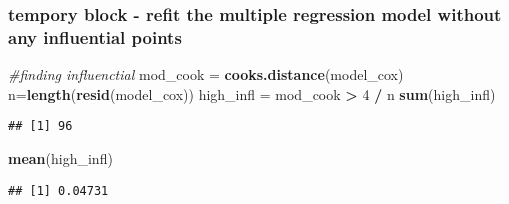 \documentclass[]{article}
\newenvironment{Shaded}{\begin{snugshade}}{\end{snugshade}}
\newcommand{\CommentTok}[1]{\textcolor[rgb]{0.56,0.35,0.01}{\textit{#1}}}
\newcommand{\DecValTok}[1]{\textcolor[rgb]{0.00,0.00,0.81}{#1}}
\newcommand{\KeywordTok}[1]{\textcolor[rgb]{0.13,0.29,0.53}{\textbf{#1}}}
\newcommand{\NormalTok}[1]{#1}
\newcommand{\OperatorTok}[1]{\textcolor[rgb]{0.81,0.36,0.00}{\textbf{#1}}}
\newcommand{\StringTok}[1]{\textcolor[rgb]{0.31,0.60,0.02}{#1}}
\begin{document}
\hypertarget{tempory-block---refit-the-multiple-regression-model-without-any-influential-points}{%
\subsubsection{tempory block - refit the multiple regression model
without any influential
points}\label{tempory-block---refit-the-multiple-regression-model-without-any-influential-points}}

\begin{Shaded}
\begin{Highlighting}[]
\CommentTok{#finding influenctial}
\NormalTok{mod_cook =}\StringTok{ }\KeywordTok{cooks.distance}\NormalTok{(model_cox)}
\NormalTok{n=}\KeywordTok{length}\NormalTok{(}\KeywordTok{resid}\NormalTok{(model_cox))}
\NormalTok{high_infl =}\StringTok{ }\NormalTok{mod_cook }\OperatorTok{>}\StringTok{ }\DecValTok{4} \OperatorTok{/}\StringTok{ }\NormalTok{n}
\KeywordTok{sum}\NormalTok{(high_infl)     }
\end{Highlighting}
\end{Shaded}

\begin{verbatim}
## [1] 96
\end{verbatim}

\begin{Shaded}
\begin{Highlighting}[]
\KeywordTok{mean}\NormalTok{(high_infl)}
\end{Highlighting}
\end{Shaded}

\begin{verbatim}
## [1] 0.04731
\end{verbatim}
\end{document}
